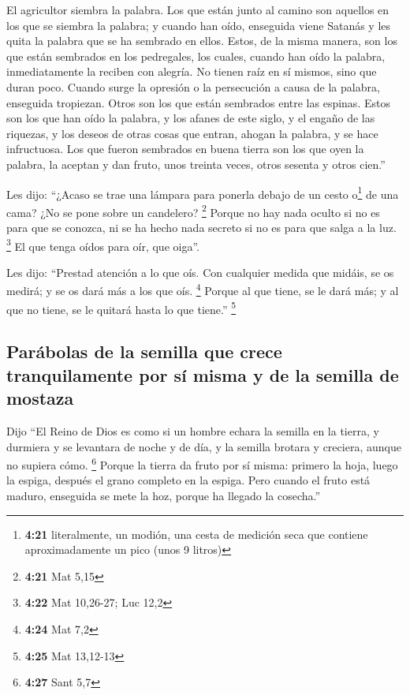 \begin{paracol}{2}
 El agricultor siembra la palabra.  Los
que están junto al camino son aquellos en los que se siembra la palabra;
y cuando han oído, enseguida viene Satanás y les quita la palabra que se
ha sembrado en ellos.  Estos, de la misma manera, son los
que están sembrados en los pedregales, los cuales, cuando han oído la
palabra, inmediatamente la reciben con alegría.  No
tienen raíz en sí mismos, sino que duran poco. Cuando surge la opresión
o la persecución a causa de la palabra, enseguida tropiezan.
 Otros son los que están sembrados entre las espinas.
Estos son los que han oído la palabra,  y los afanes de
este siglo, y el engaño de las riquezas, y los deseos de otras cosas que
entran, ahogan la palabra, y se hace infructuosa.  Los
que fueron sembrados en buena tierra son los que oyen la palabra, la
aceptan y dan fruto, unos treinta veces, otros sesenta y otros cien.''

 Les dijo: ``¿Acaso se trae una lámpara para ponerla
debajo de un cesto o\footnote{\textbf{4:21} literalmente, un modión, una
  cesta de medición seca que contiene aproximadamente un pico (unos 9
  litros)} de una cama? ¿No se pone sobre un candelero? \footnote{\textbf{4:21}
  Mat 5,15}  Porque no hay nada oculto si no es para que
se conozca, ni se ha hecho nada secreto si no es para que salga a la
luz. \footnote{\textbf{4:22} Mat 10,26-27; Luc 12,2}  El
que tenga oídos para oír, que oiga''.

 Les dijo: ``Prestad atención a lo que oís. Con cualquier
medida que midáis, se os medirá; y se os dará más a los que oís.
\footnote{\textbf{4:24} Mat 7,2}  Porque al que tiene, se
le dará más; y al que no tiene, se le quitará hasta lo que tiene.''
\footnote{\textbf{4:25} Mat 13,12-13}

\hypertarget{paruxe1bolas-de-la-semilla-que-crece-tranquilamente-por-suxed-misma-y-de-la-semilla-de-mostaza}{%
\subsection{Parábolas de la semilla que crece tranquilamente por sí
misma y de la semilla de
mostaza}\label{paruxe1bolas-de-la-semilla-que-crece-tranquilamente-por-suxed-misma-y-de-la-semilla-de-mostaza}}

 Dijo ``El Reino de Dios es como si un hombre echara la
semilla en la tierra,  y durmiera y se levantara de noche
y de día, y la semilla brotara y creciera, aunque no supiera cómo.
\footnote{\textbf{4:27} Sant 5,7}  Porque la tierra da
fruto por sí misma: primero la hoja, luego la espiga, después el grano
completo en la espiga.  Pero cuando el fruto está maduro,
enseguida se mete la hoz, porque ha llegado la cosecha.''


\end{paracol}
